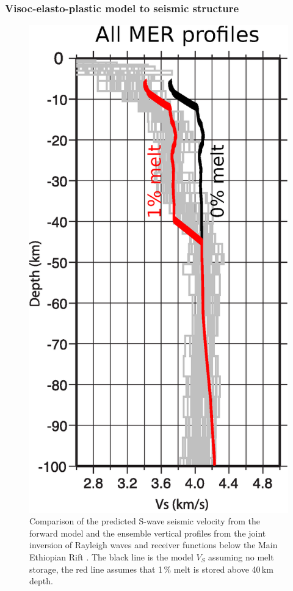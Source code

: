 \documentclass[aspectratio=169]{beamer}
\begin{document}
\begin{frame}
    \frametitle{Visoc-elasto-plastic model to seismic structure}
    \begin{figure}
        \includegraphics[height=0.5\paperheight]{./figures/MER2.png}
        \caption{Comparison of the predicted S-wave seismic velocity from the forward model and the ensemble vertical
                 profiles from the joint inversion of Rayleigh waves and receiver functions below the Main Ethiopian Rift
                 \citep{karanen-etal-2009}. The black line is the model $V_{S}$ assuming no melt storage, the red line
                 assumes that 1\,\% melt is stored above 40\,km depth.}
    \end{figure}
\end{frame}
\end{document}
